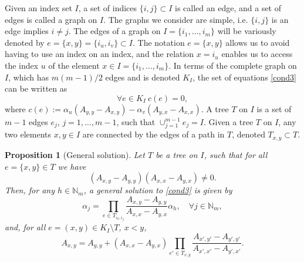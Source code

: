 \documentclass{article}
\newcounter{NN}
\newtheorem{proposition}[NN]{Proposition}
\def\N{\mathbb{N}}
\begin{document}
Given an index set $I$, a set of indices $\{i,j\}\subset I$ is called an edge, and a set of edges is called a graph on $I$. The graphs we consider are simple, i.e. $\{i,j\}$ is an edge implies $i\neq j$. The edges of a graph on $I=\{i_1,\ldots,i_m\}$ will be variously denoted by $e=\{x,y\}=\{i_{u},i_{v}\}\subset I$. The notation $e=\{x,y\}$ allows us to avoid having to use an index on an index, and the relation $x=i_{u}$ enables us to access the index $u$ of the element $x\in I=\{i_1,\ldots,i_m\}$. In terms of the complete graph on $I$, which has $m(m-1)/2$ edges and is denoted $K_I$, the set of equations \eqref{cond3} can be written as
\begin{equation} \label{ce}
\forall e\in K_I\ c(e)=0,
\end{equation}
where $c(e) := \alpha_{u}(A_{y,y}-A_{x,y}) - \alpha_{v} (A_{y,x}-A_{x,x})$. A tree $T$ on $I$ is a set of $m-1$ edges $e_j$, $j=1,\ldots, m-1$, such that $\cup_{j=1}^{m-1} e_j=I$. Given a tree $T$ on $I$, any two elements $x,y\in I$ are connected by the edges of a path in $T$, denoted $T_{x,y}\subset T$.
\begin{proposition}[General solution]
\label{p1} 
Let $T$ be a tree on $I$, such that for all $e=\{x,y\}\in T$ we have
\begin{equation} \label{neqs}
(A_{x,y}-A_{y,y})(A_{x,x}-A_{y,x})\neq 0.
\end{equation}
Then, for any $h\in \N_m$, a general solution to \eqref{cond3} is given by
\begin{equation} \label{sal}
\alpha_j=\prod_{e\in T_{i_h,i_j}}\frac{A_{x,y}-A_{y,y}}{A_{x,x}-A_{y,x}}\alpha_h,\quad \forall j\in \N_m,
\end{equation}
and, for all $e=(x,y) \in K_I\setminus T$, $x<y$,
\begin{equation} \label{sax}
A_{x,y}=A_{y,y}+\left(A_{x,x}-A_{y,x}\right)\prod_{e'\in T_{x,y}}\frac{A_{x',y'}-A_{y',y'}}{A_{x',x'}-A_{y',x'}}.
\end{equation}
\end{proposition}
\end{document}
